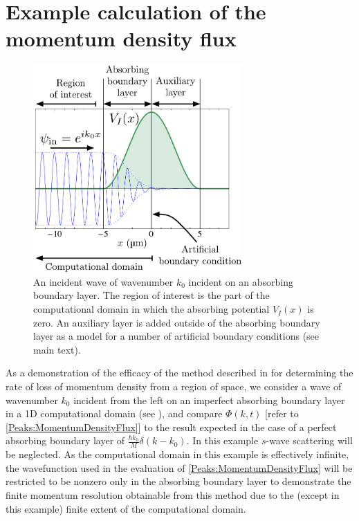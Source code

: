 \section{Example calculation of the momentum density flux}
\label{MethodsAppendix:MomentumDensityFluxExampleCalculation}

\begin{figure}
    \centering
    \includegraphics[width=8cm]{AbsorbingBoundaryLayerScattering}
    \caption{\label{MethodsAppendix:AbsorbingBoundaryLayerScattering} An incident wave of wavenumber $k_0$ incident on an absorbing boundary layer. The region of interest is the part of the computational domain in which the absorbing potential $V_I(x)$ is zero. An auxiliary layer is added outside of the absorbing boundary layer as a model for a number of artificial boundary conditions (see main text).}
\end{figure}

As a demonstration of the efficacy of the method described in  for determining the rate of loss of momentum density from a region of space, we consider a wave of wavenumber $k_0$ incident from the left on an imperfect absorbing boundary layer in a 1D computational domain (see ), and compare $\Phi(k, t)$ [refer to \eqref{Peaks:MomentumDensityFlux}] to the result expected in the case of a perfect absorbing boundary layer of $\displaystyle \frac{\hbar k_0}{M}\delta(k - k_0)$. In this example $s$-wave scattering will be neglected. As the computational domain in this example is effectively infinite, the wavefunction used in the evaluation of \eqref{Peaks:MomentumDensityFlux} will be restricted to be nonzero only in the absorbing boundary layer to demonstrate the finite momentum resolution obtainable from this method due to the (except in this example) finite extent of the computational domain.


